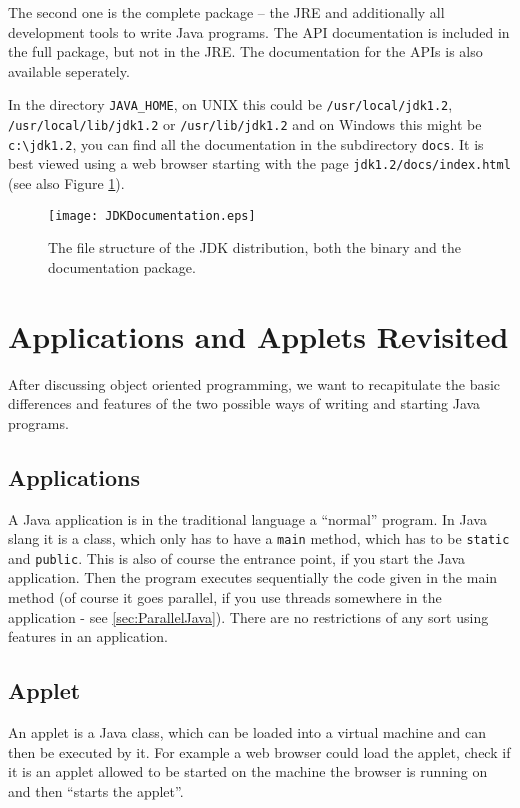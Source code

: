 The second one is the complete package -- 
the JRE and additionally all development tools to write Java programs.
The API documentation is included in the full package, but not
in the JRE. The documentation for the APIs is also available seperately.

In the directory \verb|JAVA_HOME|, on UNIX this could be 
\verb|/usr/local/jdk1.2|, \verb|/usr/local/lib/jdk1.2| or 
\verb|/usr/lib/jdk1.2| and on Windows this might be \verb|c:\jdk1.2|, 
you can find all the documentation in the subdirectory
\verb|docs|. It is best viewed using a web browser
starting with the page \verb|jdk1.2/docs/index.html| 
(see also Figure \ref{fig:JDKFiles}).
\begin{figure}[htbp]
  \begin{center}
    \texttt{[image: JDKDocumentation.eps]}
    \caption{The file structure of the JDK distribution, 
      both the binary and the documentation package.}
    \label{fig:JDKFiles}
  \end{center}
\end{figure}


\section{Applications and Applets Revisited}

After discussing object oriented programming,
we want to recapitulate the basic differences and features of
the two possible ways of writing and starting Java programs.

\subsection{Applications}
A Java application is in the traditional language a ``normal'' program.
In Java slang it is a class, which only has to have a \verb|main|
method, which has to be \verb|static| and \verb|public|. This is also of course the
entrance point, if you start the Java application. Then the program
executes sequentially the code given in the main method (of course it
goes parallel, if you use threads somewhere in the application - see
\ref{sec:ParallelJava}). There are no restrictions of any sort using
features in an application.


\subsection{Applet}
An applet is a Java class, which can be loaded into a virtual machine
and can then be executed by it. 
For example a web browser could load
the applet, check if it is an applet allowed to be started on the
machine the browser is running on and then ``starts the applet''.

